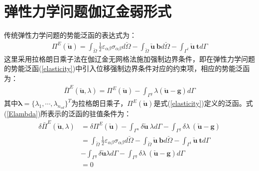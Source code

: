 \documentclass[engineeringmaster]{hquThesis}
\begin{document}
\section{弹性力学问题伽辽金弱形式}
传统弹性力学问题的势能泛函的表达式为：
\begin{equation}\label{elasticity}
\begin{split}
    \Pi^E(\breve{\pmb{u}})=\int_{\breve{\Omega}}\frac{1}{2}\varepsilon_{\alpha\beta}\sigma_{\alpha\beta}d\breve{\Omega}-\int_{\breve{\Omega}}\breve{\pmb{u}}~\pmb{b}d\breve{\Omega}-\int_{\Gamma^t}\breve{\pmb{u}}~\pmb{t}d\Gamma
\end{split}
\end{equation}
这里采用拉格朗日乘子法在伽辽金无网格法施加强制边界条件，即在弹性力学问题的势能泛函(\ref{elasticity})中引入位移强制边界条件对应的约束项，相应的势能泛函为：
\begin{equation}\label{Elambda}
\begin{split}
    \bar{\Pi}^E(\breve{\pmb{u}},\lambda)=\Pi^E(\breve{\pmb{u}})-\int_{\Gamma^g}\lambda(\breve{\pmb{u}}-\pmb{g})d\Gamma
\end{split}
\end{equation}
其中$\pmb{\lambda}=\{\lambda_1,\dotsb,\lambda_{n_{sd}}\}^T$为拉格朗日乘子，$\Pi^E(\breve{\pmb{u}})$是式(\ref{elasticity})定义的泛函。式(\ref{Elambda})所表示的泛函的驻值条件为：
\begin{equation} 
\begin{split}
    \delta\bar{\Pi}^E(\breve{\pmb{u}},\lambda)&=\delta\Pi^E(\breve{\pmb{u}})-\int_{\Gamma^u}\delta\breve{\pmb{u}}~\lambda d\Gamma-\int_{\Gamma^g}\delta\lambda~(\breve{\pmb{u}}-\pmb{g})\\
    &=\int_{\breve{\Omega}}\frac{1}{2}\varepsilon_{\alpha\beta}\sigma_{\alpha\beta}d\breve{\Omega}-\int_{\breve{\Omega}}\breve{\pmb{u}}~\pmb{b}d\breve{\Omega}-\int_{\Gamma^t}\breve{\pmb{u}}~\pmb{t}d\Gamma\\
    &-\int_{\Gamma^g}\delta\breve{\pmb{u}}\lambda d\Gamma-\int_{\Gamma^g}\delta\lambda~(\breve{\pmb{u}}-\pmb{g})d\Gamma\\
    &=0
\end{split}
\end{equation}
\end{document}
